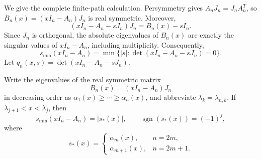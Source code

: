 \documentclass[review,hidelinks,onefignum,onetabnum]{siamart251216}
\begin{document}
We give the complete finite-path calculation.  Persymmetry gives
\(A_nJ_n=J_nA_n^T\), so
\(B_n(x)=(xI_n-A_n)J_n\) is real symmetric.  Moreover,
\[
 (xI_n-A_n-sJ_n)J_n=B_n(x)-sI_n.
\]
Since \(J_n\) is orthogonal, the absolute eigenvalues of \(B_n(x)\)
are exactly the singular values of \(xI_n-A_n\), including multiplicity.
Consequently,
\begin{equation}\label{eq:signed-pencil}
 s_{\min}(xI_n-A_n)
 =\min\{|s|:\det(xI_n-A_n-sJ_n)=0\}.
\end{equation}
Let \(q_n(x,s)=\det(xI_n-A_n-sJ_n)\).
\begin{lemma}\label{lem:middle-branch}
Write the eigenvalues of the real symmetric matrix
\[
 B_n(x)=(xI_n-A_n)J_n
\]
in decreasing order as
\(\alpha_1(x)\geq\cdots\geq\alpha_n(x)\), and abbreviate
\(\lambda_k=\lambda_{n,k}\).
If \(\lambda_{j+1}<x<\lambda_j\), then
\[
 s_{\min}(xI_n-A_n)=|s_*(x)|,
 \qquad \operatorname{sgn}(s_*(x))=(-1)^j,
\]
where
\[
 s_*(x)=
 \begin{cases}
  \alpha_m(x),&n=2m,\\
  \alpha_{m+1}(x),&n=2m+1.
 \end{cases}
\]
\end{lemma}
\end{document}
